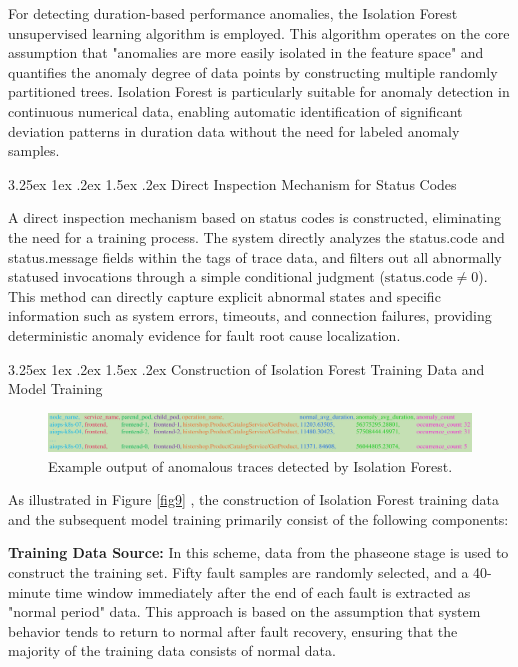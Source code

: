 \documentclass[10pt]{article}
\makeatletter
\let\oldref\ref
\renewcommand{\ref}[1]{%
    \textcolor{blue}{\oldref{#1}}%
}
\renewcommand{\paragraph}{%
    \@startsection{paragraph}{4}{\z@}%
    {3.25ex \@plus1ex \@minus.2ex}%
    {1.5ex \@plus.2ex}%
    {\normalfont\normalsize\itshape}%
}
\makeatother
\begin{document}
For detecting duration-based performance anomalies, the Isolation Forest unsupervised learning algorithm is employed. This algorithm operates on the core assumption that "anomalies are more easily isolated in the feature space" and quantifies the anomaly degree of data points by constructing multiple randomly partitioned trees. Isolation Forest is particularly suitable for anomaly detection in continuous numerical data, enabling automatic identification of significant deviation patterns in duration data without the need for labeled anomaly samples.

\paragraph{Direct Inspection Mechanism for Status Codes}

A direct inspection mechanism based on status codes is constructed, eliminating the need for a training process. The system directly analyzes the status.code and status.message fields within the tags of trace data, and filters out all abnormally statused invocations through a simple conditional judgment (\( \text{status.code} \neq 0 \)). This method can directly capture explicit abnormal states and specific information such as system errors, timeouts, and connection failures, providing deterministic anomaly evidence for fault root cause localization.

\paragraph{Construction of Isolation Forest Training Data and Model Training}

\begin{figure}[htbp]
    \centering
    \includegraphics[width=1.0\textwidth]{fig10.pdf}
    \caption{Example output of anomalous traces detected by Isolation Forest.}
    \label{fig10}
\end{figure}

As illustrated in Figure \ref{fig9}, the construction of Isolation Forest training data and the subsequent model training primarily consist of the following components:

\textbf{Training Data Source:} In this scheme, data from the phaseone stage is used to construct the training set. Fifty fault samples are randomly selected, and a 40-minute time window immediately after the end of each fault is extracted as "normal period" data. This approach is based on the assumption that system behavior tends to return to normal after fault recovery, ensuring that the majority of the training data consists of normal data.
\end{document}
